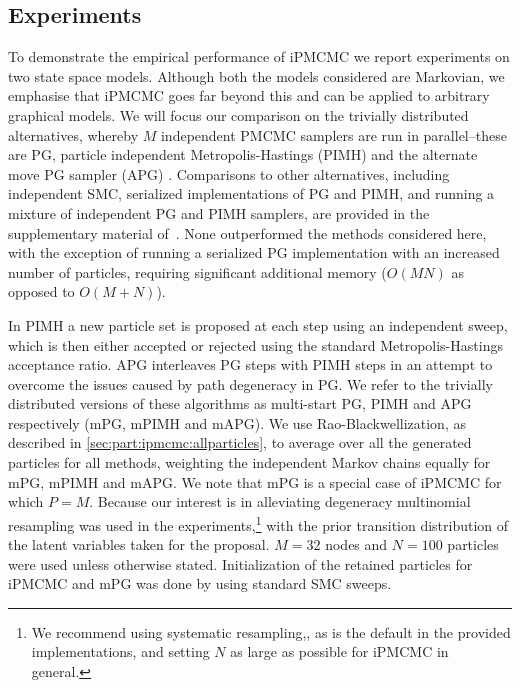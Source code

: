 
\subsection{Experiments}
\label{sec:experiments}

To demonstrate the %
empirical performance of iPMCMC we report experiments on two state space models.  
Although both the models considered are Markovian, we emphasise that iPMCMC goes far beyond this and can be applied to arbitrary graphical models. 
We will focus our comparison on the trivially distributed alternatives, whereby $M$ independent PMCMC samplers are run in parallel--these are PG, particle independent Metropolis-Hastings (PIMH) \cite{andrieuDH2010} and the alternate move PG sampler (APG) \cite{holenstein2009particle}. Comparisons to other alternatives, including independent SMC, serialized implementations of PG and PIMH, and running a mixture of independent PG and PIMH samplers, are provided in the supplementary material of~\cite{rainforth2016interacting}.  
None outperformed the methods considered here, with the exception of running a serialized PG implementation with an increased number of particles, requiring significant additional memory ($O(MN)$ as opposed to $O(M+N)$).

In PIMH a new particle set is proposed at each \mcmc step using an independent \smc sweep, which is then either accepted or rejected using the standard Metropolis-Hastings acceptance ratio. %
APG interleaves PG steps with PIMH steps
in an attempt to overcome the issues caused by path degeneracy in PG.  We refer to the trivially distributed versions of these algorithms as multi-start PG, PIMH and APG respectively (mPG, mPIMH and mAPG). 
We use Rao-Blackwellization, as described in \ref{sec:part:ipmcmc:allparticles}, to average over all the generated particles for all methods, weighting the independent Markov chains equally for mPG, mPIMH and mAPG. We note that mPG is a special case of iPMCMC for which $P=M$.  Because our interest is in alleviating degeneracy multinomial resampling was used in the experiments,\footnote{We recommend
	using systematic resampling,, as is the default in the provided implementations, and setting $N$ as large as possible for iPMCMC in general.}
 with the prior transition distribution of the latent variables taken for the proposal.  $M=32$ nodes and $N=100$ particles were used unless otherwise stated.  Initialization of the retained particles for iPMCMC and mPG was done by using standard SMC sweeps.

